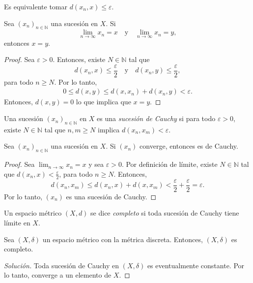 \documentclass[11pt]{article}
\begin{document}
\begin{remark}
    Es equivalente tomar $d(x_n, x) \leq \varepsilon$.
\end{remark}

\begin{proposition}
    Sea $(x_n)_{n \in \mathbb{N}}$ una sucesión en $X$. Si 
    $$
        \lim_{n \to \infty} x_n = x \quad\text{y}\quad \lim_{n \to \infty} x_n = y,
    $$
    entonces $x = y$.
\end{proposition}

\begin{proof}
    Sea $\varepsilon > 0$. Entonces, existe $N \in \mathbb{N}$ tal que 
    $$
        d(x_n, x) \leq \frac{\varepsilon}{2} \quad \text{y} \quad d(x_n, y) \leq \frac{\varepsilon}{2},
    $$
    para todo $n \geq N$. Por lo tanto,
    \begin{align*}
        0 \leq  d(x, y) \leq d(x, x_n) + d(x_n, y) < \varepsilon.
    \end{align*}
    Entonces, $d(x, y) = 0$ lo que implica que $x = y$.
\end{proof}

\begin{definition}
    Una sucesión $(x_n)_{n \in \mathbb{N}}$ en $X$ es una \emph{sucesión de Cauchy} si para todo $\varepsilon > 0$, existe $N \in \mathbb{N}$ tal que $n, m \geq N$ implica $d(x_n, x_m) < \varepsilon$.
\end{definition}

\begin{proposition}
    Sea $(x_n)_{n \in \mathbb{N}}$ una sucesión en $X$. Si $(x_n)$ converge, entonces es de Cauchy.
\end{proposition}

\begin{proof}
    Sea $\lim_{n \to \infty} x_n = x$ y sea $\varepsilon > 0$. Por definición de límite, existe $N \in \mathbb{N}$ tal que $d(x_n, x) < \frac{\varepsilon}{2}$, para todo $n \geq N$. Entonces,
    $$
        d(x_n, x_m) \leq d(x_n, x) + d(x, x_m) < \frac{\varepsilon}{2} + \frac{\varepsilon}{2} = \varepsilon.
    $$
    Por lo tanto, $(x_n)$ es una sucesión de Cauchy.
\end{proof}

\begin{definition}
    Un espacio métrico $(X, d)$ se dice \emph{completo} si toda sucesión de Cauchy tiene límite en $X$.   
\end{definition}

\begin{example}
    Sea $(X, \delta)$ un espacio métrico con la métrica discreta. Entonces, $(X, \delta)$ es completo.
\end{example}

\begin{proof}[Solución]
    Toda sucesión de Cauchy en $(X, \delta)$ es eventualmente constante. Por lo tanto, converge a un elemento de $X$.
\end{proof}
\end{document}
